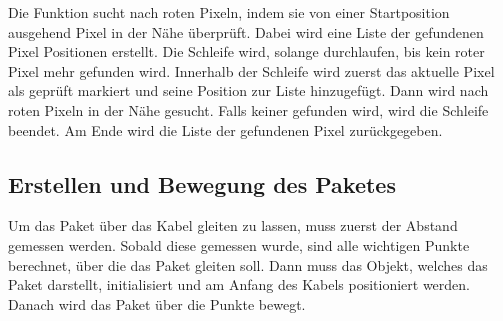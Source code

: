 Die Funktion sucht nach roten Pixeln, indem sie von einer Startposition ausgehend Pixel in der Nähe überprüft. Dabei wird eine Liste der gefundenen Pixel Positionen erstellt. Die Schleife wird, solange durchlaufen, bis kein roter Pixel mehr gefunden wird. Innerhalb der Schleife wird zuerst das aktuelle Pixel als geprüft markiert und seine Position zur Liste hinzugefügt. Dann wird nach roten Pixeln in der Nähe gesucht. Falls keiner gefunden wird, wird die Schleife beendet. Am Ende wird die Liste der gefundenen Pixel zurückgegeben.


\subsection{Erstellen und Bewegung des Paketes}
Um das Paket über das Kabel gleiten zu lassen, muss zuerst der Abstand gemessen werden. Sobald diese gemessen wurde, sind alle wichtigen Punkte berechnet, über die das Paket gleiten soll. Dann muss das Objekt, welches das Paket darstellt, initialisiert und am Anfang des Kabels positioniert werden. Danach wird das Paket über die Punkte bewegt.

